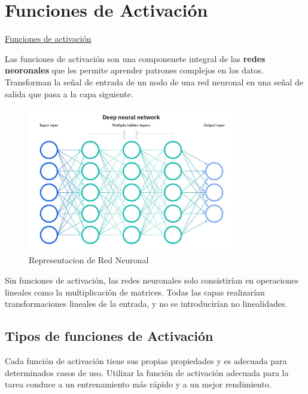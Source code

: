 \documentclass[12pt]{article}
\begin{document}
  \section{Funciones de Activación}
    \href{https://www.datacamp.com/es/tutorial/introduction-to-activation-functions-in-neural-networks}{Funciones de activación}
    
    Las funciones de activación son una componenete integral de las \textbf{redes neoronales} que les permite aprender
    patrones complejos en los datos. Transforman la señal de entrada de un nodo de una red 
    neuronal en una señal de salida que pasa a la capa siguiente. \par
    \begin{figure}[H]
      \centering
      \includegraphics[width=0.8\textwidth]{./Imagenes/FuncionesdeActivacion.png}
      \caption{Representacion de Red Neuronal}
      \label{fig:tercera}
    \end{figure}
    
    \noindent
    Sin funciones de activación, las redes neuronales solo consistirían en ope\-ra\-ciones lineales como la multiplicación de matrices. 
    Todas las capas realizarían transformaciones lineales de la entrada, y no se introducirían no linealidades.
    \subsection*{Tipos de funciones de Activación}
    Cada función de activación tiene sus propias propiedades y es adecuada para determinados casos de uso.
    Utilizar la función de activación adecuada para la tarea conduce a un entrenamiento más rápido y 
    a un mejor rendimiento.
\end{document}
